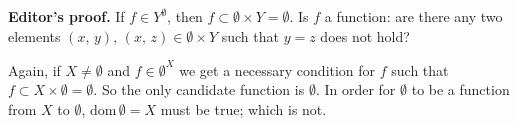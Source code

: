 \textbf{Editor's proof.} If $f \in Y^\emptyset$, then $f \subset \emptyset \times Y = \emptyset$. Is $f$ a function: are there any two elements $(x, \, y), \, (x, \, z) \in \emptyset \times Y$ such that $y = z$ does not hold? 

Again, if $X \neq \emptyset$ and $f \in \emptyset^X$ we get a necessary condition for $f$ such that $f \subset X \times \emptyset = \emptyset$. So the only candidate function is $\emptyset$. In order for $\emptyset$ to be a function from $X$ to $\emptyset$, $\text{dom} \, \emptyset = X$ must be true; which is not.
